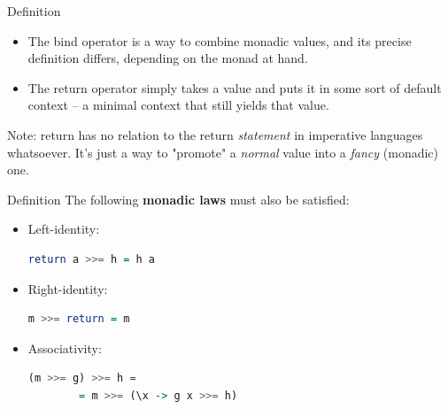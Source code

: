 \documentclass{beamer}
\begin{document}
\begin{frame}[fragile]{Definition}
    \begin{itemize}
        \setlength \itemsep{1em}
        \item The bind operator is a way to combine monadic values, and
              its precise definition differs, depending on the monad at
              hand.
        \item The return operator simply takes a value and puts it in some
        sort of default context -- a minimal context that still yields that
        value.
    \end{itemize}

    \bigbreak
    Note: return has no relation to the return \textit{statement} in
    imperative languages whatsoever. It's just a way to "promote" a
    \textit{normal} value into a \textit{fancy} (monadic) one.
\end{frame}

\begin{frame}[fragile]{Definition}
    The following \textbf{monadic laws} must also be satisfied:

    \bigbreak
    \begin{itemize}
        \item Left-identity:

        \begin{minipage}{\linewidth} \hspace{1cm}
        \begin{lstlisting}[language=haskell, numbers=none, frame=none]
          return a >>= h = h a
        \end{lstlisting}
        \end{minipage}

        \item Right-identity:

        \begin{minipage}{\linewidth} \hspace{1cm}
        \begin{lstlisting}[language=haskell, numbers=none, frame=none]
            m >>= return = m
        \end{lstlisting}
        \end{minipage}

        \item Associativity:

        \begin{minipage}{\linewidth} \hspace{1cm}
        \begin{lstlisting}[language=haskell, numbers=none, frame=none]
            (m >>= g) >>= h =
        = m >>= (\x -> g x >>= h)
        \end{lstlisting}
        \end{minipage} \hspace{1cm}
    \end{itemize}
\end{frame}
\end{document}
